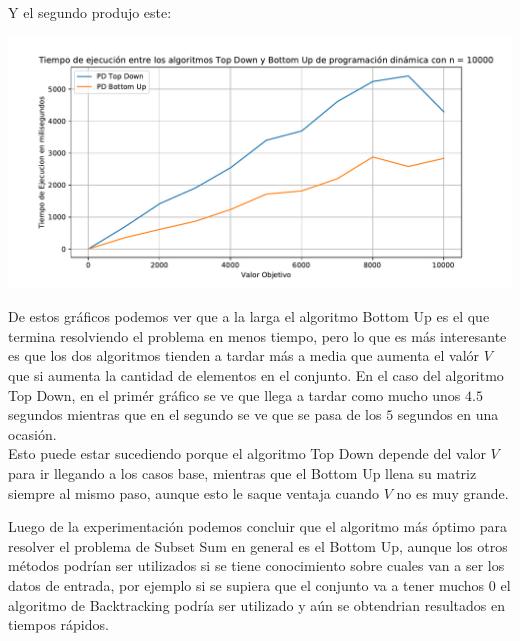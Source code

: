 \documentclass[a4paper]{article}
\begin{document}
Y el segundo produjo este:

\begin{center}
	\includegraphics[width=.8\linewidth]{G4.pdf}
\end{center}

De estos gráficos podemos ver que a la larga el algoritmo Bottom Up es el que termina resolviendo el problema en menos tiempo, pero lo que es más interesante es que los dos algoritmos tienden a tardar más a media que aumenta el valór $V$ que si aumenta la cantidad de elementos en el conjunto. En el caso del algoritmo Top Down, en el primér gráfico se ve que llega a tardar como mucho unos $4.5$ segundos mientras que en el segundo se ve que se pasa de los $5$ segundos en una ocasión.
\\
Esto puede estar sucediendo porque el algoritmo Top Down depende del valor $V$ para ir llegando a los casos base, mientras que el Bottom Up llena su matriz siempre al mismo paso, aunque esto le saque ventaja cuando $V$ no es muy grande.

Luego de la experimentación podemos concluir que el algoritmo más óptimo para resolver el problema de Subset Sum en general es el Bottom Up, aunque los otros métodos podrían ser utilizados si se tiene conocimiento sobre cuales van a ser los datos de entrada, por ejemplo si se supiera que el conjunto va a tener muchos 0 el algoritmo de Backtracking podría ser utilizado y aún se obtendrian resultados en tiempos rápidos.



%
\end{document}
